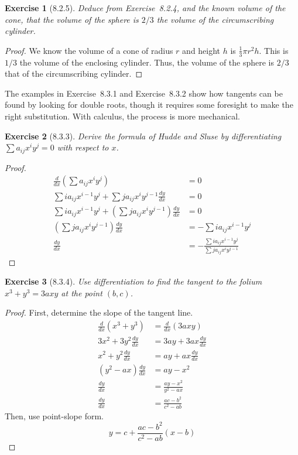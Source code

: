\documentclass[12pt]{article}
\theoremstyle{plain}
\newtheorem{ex}{Exercise}
\begin{document}
\begin{ex} [8.2.5]
  Deduce from Exercise~8.2.4, and the known volume of the cone, that the volume of the sphere is $2/3$ the volume of the circumscribing cylinder.
\end{ex}

\begin{proof}
  We know the volume of a cone of radius $r$ and height $h$ is $\frac{1}{3}\pi r^2h$. This is $1/3$ the volume of the enclosing cylinder. Thus, the volume of the sphere is $2/3$ that of the circumscribing cylinder.
\end{proof}

The examples in Exercise~8.3.1 and Exercise~8.3.2 show how tangents can be found by looking for double roots, though it requires some foresight to make the right substitution. With calculus, the process is more mechanical.

\begin{ex} [8.3.3]
  Derive the formula of Hudde and Sluse by differentiating $\sum a_{ij}x^iy^j=0$ with respect to $x$.
\end{ex}

\begin{proof}
  \begin{align*}
    \frac{d}{dx}\left(\sum a_{ij}x^iy^j\right)                              &= 0 \\
    \sum ia_{ij}x^{i-1}y^j+\sum ja_{ij}x^iy^{j-1}\frac{dy}{dx}              &= 0 \\
    \sum ia_{ij}x^{i-1}y^j+\left(\sum ja_{ij}x^iy^{j-1}\right)\frac{dy}{dx} &= 0 \\
    \left(\sum ja_{ij}x^iy^{j-1}\right)\frac{dy}{dx}                        &= -\sum ia_{ij}x^{i-1}y^j \\
    \frac{dy}{dx}                                                           &= -\frac{\sum ia_{ij}x^{i-1}y^j}{\sum ja_{ij}x^iy^{j-1}}
  \end{align*}
\end{proof}

\begin{ex} [8.3.4]
  Use differentiation to find the tangent to the folium $x^3+y^3=3axy$ at the point $(b,c)$.
\end{ex}

\begin{proof}
  First, determine the slope of the tangent line.
  \begin{align*}
    \frac{d}{dx}(x^3+y^3)   &= \frac{d}{dx}(3axy) \\
    3x^2+3y^2\frac{dy}{dx}  &= 3ay+3ax\frac{dy}{dx} \\
    x^2+y^2\frac{dy}{dx}    &= ay+ax\frac{dy}{dx} \\
    (y^2-ax)\frac{dy}{dx}   &= ay-x^2 \\
    \frac{dy}{dx}           &= \frac{ay-x^2}{y^2-ax} \\
    \frac{dy}{dx}           &= \frac{ac-b^2}{c^2-ab}
  \end{align*}
  Then, use point-slope form.
  \[
    y=c+\frac{ac-b^2}{c^2-ab}(x-b)
  \]
\end{proof}
\end{document}
